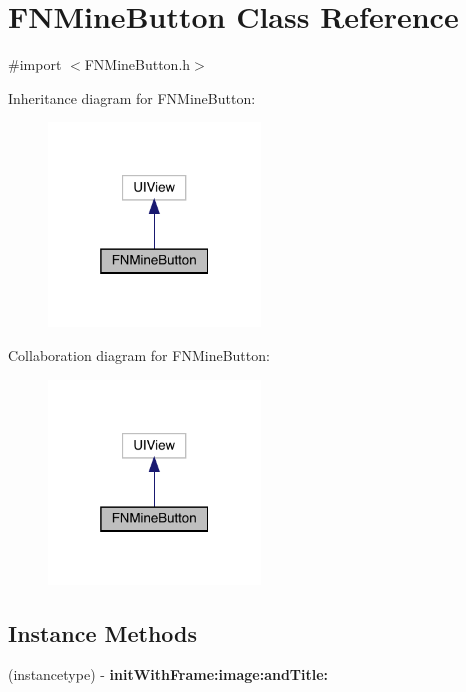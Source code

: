\hypertarget{interface_f_n_mine_button}{}\section{F\+N\+Mine\+Button Class Reference}
\label{interface_f_n_mine_button}


{\ttfamily \#import $<$F\+N\+Mine\+Button.\+h$>$}



Inheritance diagram for F\+N\+Mine\+Button\+:\nopagebreak
\begin{figure}[H]
\begin{center}
\leavevmode
\includegraphics[width=160pt]{interface_f_n_mine_button__inherit__graph}
\end{center}
\end{figure}


Collaboration diagram for F\+N\+Mine\+Button\+:\nopagebreak
\begin{figure}[H]
\begin{center}
\leavevmode
\includegraphics[width=160pt]{interface_f_n_mine_button__coll__graph}
\end{center}
\end{figure}
\subsection*{Instance Methods}
\begin{DoxyCompactItemize}
\item 
\mbox{\label{interface_f_n_mine_button_a37897b167f50244ee4fbc7273572acb8}} 
(instancetype) -\/ {\bfseries init\+With\+Frame\+:image\+:and\+Title\+:}
\end{DoxyCompactItemize}
